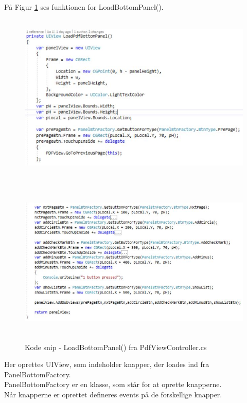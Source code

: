 På Figur \ref{fig:LoadBtnPanel2} ses funktionen for LoadBottomPanel().
\begin{figure}[H] %
	\centering
	\includegraphics[height=8cm, width=15cm]{../ArkitekturDesign/Design/RegisterPDF/LoadBtnPanel1}
\end{figure}
\begin{figure}[H] %
	\centering
	\includegraphics[height=8cm, width=15cm]{../ArkitekturDesign/Design/RegisterPDF/LoadBtnPanel2}
	\caption{Kode snip - LoadBottomPanel() fra PdfViewController.cs}
	\label{fig:LoadBtnPanel2}
\end{figure}
Her oprettes UIView, som indeholder knapper, der loades ind fra PanelBottomFactory. \\
PanelBottomFactory er en klasse, som står for at oprette knapperne. \\
Når knapperne er oprettet defineres events på de forskellige knapper. \\

\clearpage

